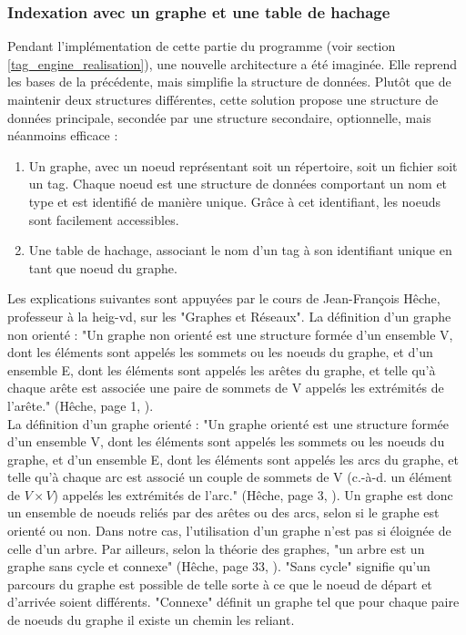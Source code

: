 \documentclass[a4paper, 12pt]{article}
\begin{document}
\subsubsection{Indexation avec un graphe et une table de hachage}\label{graphe_architecture}
Pendant l'implémentation de cette partie du programme (voir section \ref{tag_engine_realisation}), 
une nouvelle architecture a été imaginée. Elle reprend les bases de la précédente, mais simplifie 
la structure de données. Plutôt que de maintenir deux structures différentes, cette solution 
propose une structure de données principale, secondée par une structure secondaire, optionnelle, 
mais néanmoins efficace :
\begin{enumerate}
    \item Un graphe, avec un noeud représentant soit un répertoire, soit un fichier 
        soit un tag. Chaque noeud est une structure de données comportant un nom et type et est 
        identifié de manière unique. Grâce à cet identifiant, les noeuds sont facilement accessibles.
    \item Une table de hachage, associant le nom d'un tag à son identifiant unique en tant que 
        noeud du graphe.
\end{enumerate}
Les explications suivantes sont appuyées par le cours de Jean-François Hêche, professeur à la 
heig-vd, sur les "Graphes et Réseaux". La définition d'un graphe non orienté : "Un graphe non 
orienté est une structure formée d'un ensemble V, dont les éléments sont appelés les sommets 
ou les noeuds du graphe, et d'un ensemble E, dont les éléments sont appelés les arêtes du graphe, 
et telle qu'à chaque arête est associée une paire de sommets de V appelés les extrémités de 
l'arête." (Hêche, page 1, \cite{ref28}).
\\
La définition d'un graphe orienté : "Un graphe orienté est une structure formée d'un ensemble V, dont 
les éléments sont appelés les sommets ou les noeuds du graphe, et d'un ensemble E, dont les éléments 
sont appelés les arcs du graphe, et telle qu'à chaque arc est associé un couple de sommets de 
V (c.-à-d. un élément de $V \times V$) appelés les extrémités de l'arc." (Hêche, page 3, \cite{ref28}). 
\bigbreak
Un graphe est donc un ensemble de noeuds reliés par des arêtes ou des arcs, selon si le graphe est 
orienté ou non. Dans notre cas, l'utilisation d'un graphe n'est pas si éloignée de celle d'un arbre. 
Par ailleurs, selon la théorie des graphes, "un arbre est un graphe sans cycle et connexe" (Hêche, 
page 33, \cite{ref28}). "Sans cycle" signifie qu'un parcours du graphe est possible de telle sorte 
à ce que le noeud de départ et d'arrivée soient différents. "Connexe" définit un graphe tel que 
pour chaque paire de noeuds du graphe il existe un chemin les reliant.
\end{document}
